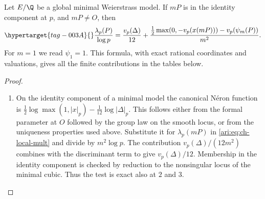 \begin{proposition}\hypertarget{tag-000W}{}\label{ari:C.6.2}

Let $E/\Q$ be a global minimal Weierstrass model. If $mP$ is
in the identity component at $p$, and $mP\ne O$, then
\begin{equation}\hypertarget{tag-003A}{}\label{ari:eq:ch-local-exact}
 \frac{\lambda_p(P)}{\log p}
 =\frac{v_p(\Delta)}{12}
   +\frac{\frac12\max(0,-v_p(x(mP)))-v_p(\psi_m(P))}{m^2}.
\end{equation}
For $m=1$ we read $\psi_1=1$. This formula, with exact rational
coordinates and valuations, gives all the finite contributions
in the tables below.
\end{proposition}


\begin{proof}
\begin{enumerate}[label=\arabic*.,leftmargin=*]
\item On the identity component of a minimal model the canonical
N\'eron function is
$\frac12\log\max(1,|x|_p)-\frac1{12}\log|\Delta|_p$.
This follows either from the formal parameter at $O$ followed
by the group law on the smooth locus, or from the uniqueness
properties used above. Substitute it for $\lambda_p(mP)$ in
\eqref{ari:eq:ch-local-mult} and divide by $m^2\log p$.
The contribution $v_p(\Delta)/(12m^2)$ combines with the
discriminant term to give $v_p(\Delta)/12$.
Membership in the identity component is checked by reduction
to the nonsingular locus of the minimal cubic. Thus the test is
exact also at $2$ and $3$.
\end{enumerate}
\end{proof}